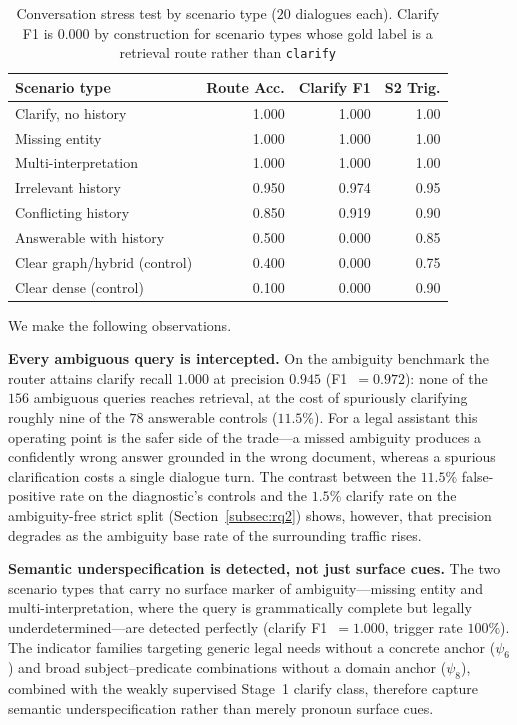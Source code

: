 \documentclass[pdflatex,sn-mathphys-num]{sn-jnl}
\begin{document}
\begin{table}[!htbp]
\centering
\caption{Conversation stress test by scenario type ($20$ dialogues each).
Clarify F1 is $0.000$ by construction for scenario types whose gold label is
a retrieval route rather than \texttt{clarify}}\label{tab:ambiguity_type}
\small
\begin{tabular}{lrrr}
\toprule
\textbf{Scenario type} & \textbf{Route Acc.} & \textbf{Clarify F1} & \textbf{S2 Trig.} \\
\midrule
Clarify, no history          & 1.000 & 1.000 & 1.00 \\
Missing entity               & 1.000 & 1.000 & 1.00 \\
Multi-interpretation         & 1.000 & 1.000 & 1.00 \\
Irrelevant history           & 0.950 & 0.974 & 0.95 \\
Conflicting history          & 0.850 & 0.919 & 0.90 \\
Answerable with history      & 0.500 & 0.000 & 0.85 \\
Clear graph/hybrid (control) & 0.400 & 0.000 & 0.75 \\
Clear dense (control)        & 0.100 & 0.000 & 0.90 \\
\bottomrule
\end{tabular}
\end{table}

We make the following observations.

\noindent\textbf{Every ambiguous query is intercepted.} On the ambiguity
benchmark the router attains clarify recall $1.000$ at precision $0.945$
(F1~$=0.972$): none of the $156$ ambiguous queries reaches retrieval, at the
cost of spuriously clarifying roughly nine of the $78$ answerable controls
($11.5\%$). For a legal assistant this operating point is the safer side of
the trade---a missed ambiguity produces a confidently wrong answer grounded
in the wrong document, whereas a spurious clarification costs a single
dialogue turn. The contrast between the $11.5\%$ false-positive rate on the
diagnostic's controls and the $1.5\%$ clarify rate on the ambiguity-free
strict split (Section~\ref{subsec:rq2}) shows, however, that precision
degrades as the ambiguity base rate of the surrounding traffic rises.

\noindent\textbf{Semantic underspecification is detected, not just surface
cues.} The two scenario types that carry no surface marker of
ambiguity---missing entity and multi-interpretation, where the query is
grammatically complete but legally underdetermined---are detected perfectly
(clarify F1~$=1.000$, trigger rate $100\%$). The indicator families targeting
generic legal needs without a concrete anchor ($\psi_6$) and broad
subject--predicate combinations without a domain anchor ($\psi_8$), combined
with the weakly supervised Stage~1 clarify class, therefore capture semantic
underspecification rather than merely pronoun surface cues.
\end{document}
